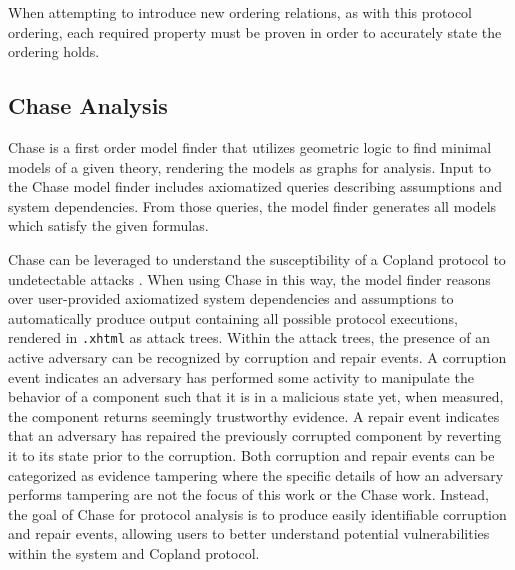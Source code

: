 \documentclass[runningheads]{llncs}
\theoremstyle{definition}
\begin{document}
\noindent When attempting to introduce new ordering relations, as with this protocol ordering, each required property must be proven in order to accurately state the ordering holds.  

\subsection*{Chase Analysis}

Chase \cite{Ramsdell:2020:Chase,Rowe:2021:AutomatedTrust} is a first order model finder that utilizes geometric logic\cite{Enderton:logic} to find minimal models of a given theory, rendering the models as graphs for analysis. Input to the Chase model finder includes axiomatized queries describing assumptions and system dependencies. From those queries, the model finder generates all models which satisfy the given formulas. 

Chase can be leveraged to understand the susceptibility of a Copland protocol to undetectable attacks \cite{Rowe:2021:AutomatedTrust}. When using Chase in this way, the model finder reasons over user-provided axiomatized system dependencies and assumptions to automatically produce output containing all possible protocol executions, rendered in \texttt{.xhtml} as attack trees. Within the attack trees, the presence of an active adversary can be recognized by corruption and repair events. A corruption event indicates an adversary has performed some activity to manipulate the behavior of a component such that it is in a malicious state yet, when measured, the component returns seemingly trustworthy evidence. A repair event indicates that an adversary has repaired the previously corrupted component by reverting it to its state prior to the corruption. Both corruption and repair events can be categorized as evidence tampering where the specific details of how an adversary performs tampering are not the focus of this work or the Chase work. Instead, the goal of Chase for protocol analysis is to produce easily identifiable corruption and repair events, allowing users to better understand potential vulnerabilities within the system and Copland protocol. 
\end{document}
